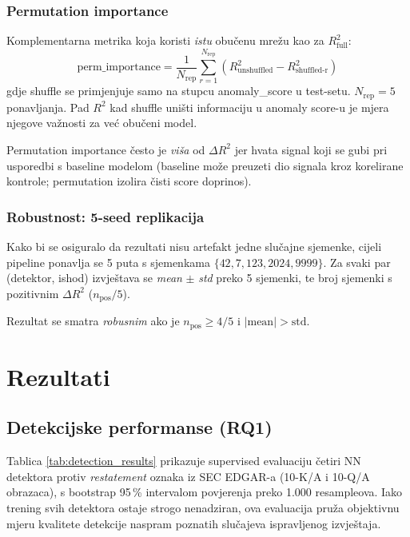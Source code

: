 \documentclass[diplomskirad,authoryear]{fer}
\begin{document}
\subsection{Permutation importance}

Komplementarna metrika koja koristi \emph{istu} obučenu mrežu kao za $R^2_{\text{full}}$:
\begin{equation}
\text{perm\_importance} = \frac{1}{N_{\text{rep}}} \sum_{r=1}^{N_{\text{rep}}} \left( R^2_{\text{unshuffled}} - R^2_{\text{shuffled-r}} \right)
\end{equation}
gdje shuffle se primjenjuje samo na stupcu anomaly\_score u test-setu. $N_{\text{rep}} = 5$ ponavljanja. Pad $R^2$ kad shuffle uništi informaciju u anomaly score-u je mjera njegove važnosti za već obučeni model.

Permutation importance često je \emph{viša} od $\Delta R^2$ jer hvata signal koji se gubi pri usporedbi s baseline modelom (baseline može preuzeti dio signala kroz korelirane kontrole; permutation izolira čisti score doprinos).

\subsection{Robustnost: 5-seed replikacija}

Kako bi se osiguralo da rezultati nisu artefakt jedne slučajne sjemenke, cijeli pipeline ponavlja se 5 puta s sjemenkama $\{42, 7, 123, 2024, 9999\}$. Za svaki par (detektor, ishod) izvještava se \emph{mean} $\pm$ \emph{std} preko 5 sjemenki, te broj sjemenki s pozitivnim $\Delta R^2$ ($n_{\text{pos}}/5$).

Rezultat se smatra \emph{robusnim} ako je $n_{\text{pos}} \geq 4/5$ i $|\text{mean}| > \text{std}$.

\chapter{Rezultati}

\section{Detekcijske performanse (RQ1)}

Tablica \ref{tab:detection_results} prikazuje supervised evaluaciju četiri NN detektora protiv \emph{restatement} oznaka iz SEC EDGAR-a (10-K/A i 10-Q/A obrazaca), s bootstrap 95\,\% intervalom povjerenja preko 1.000 resampleova. Iako trening svih detektora ostaje strogo nenadziran, ova evaluacija pruža objektivnu mjeru kvalitete detekcije naspram poznatih slučajeva ispravljenog izvještaja.
\end{document}
